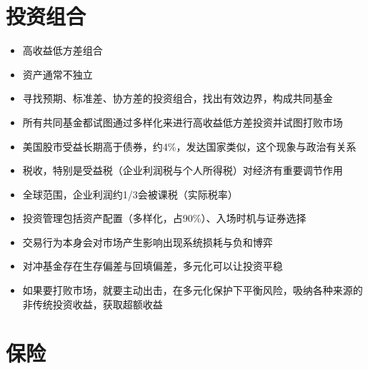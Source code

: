 \documentclass[]{book}
\providecommand{\tightlist}{%
  \setlength{\itemsep}{0pt}\setlength{\parskip}{0pt}}
\begin{document}
\hypertarget{ux6295ux8d44ux7ec4ux5408}{%
\section{投资组合}\label{ux6295ux8d44ux7ec4ux5408}}

\begin{itemize}
\tightlist
\item
  高收益低方差组合
\item
  资产通常不独立
\item
  寻找预期、标准差、协方差的投资组合，找出有效边界，构成共同基金
\item
  所有共同基金都试图通过多样化来进行高收益低方差投资并试图打败市场
\item
  美国股市受益长期高于债券，约4\%，发达国家类似，这个现象与政治有关系
\item
  税收，特别是受益税（企业利润税与个人所得税）对经济有重要调节作用
\item
  全球范围，企业利润约1/3会被课税（实际税率）
\item
  投资管理包括资产配置（多样化，占90\%）、入场时机与证券选择
\item
  交易行为本身会对市场产生影响出现系统损耗与负和博弈
\item
  对冲基金存在生存偏差与回填偏差，多元化可以让投资平稳
\item
  如果要打败市场，就要主动出击，在多元化保护下平衡风险，吸纳各种来源的非传统投资收益，获取超额收益
\end{itemize}

\hypertarget{ux4fddux9669}{%
\section{保险}\label{ux4fddux9669}}
\end{document}
